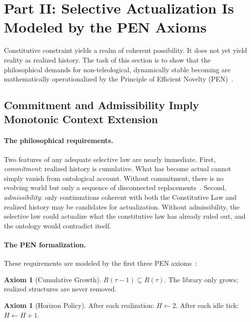\documentclass[11pt,a4paper]{article}
\theoremstyle{plain}
\theoremstyle{definition}
\newtheorem{axiom}[theorem]{Axiom}
\theoremstyle{remark}
\begin{document}
\section{Part II: Selective Actualization Is Modeled by the PEN Axioms}
\label{sec:partII}

Constitutive constraint yields a realm of coherent possibility.  It does not yet yield reality as realized history.  The task of this section is to show that the philosophical demands for non-teleological, dynamically stable becoming are mathematically operationalized by the Principle of Efficient Novelty (PEN)~\cite{pen2026}.


\subsection{Commitment and Admissibility Imply Monotonic Context Extension}
\label{sec:monotonic}

\paragraph{The philosophical requirements.}
Two features of any adequate selective law are nearly immediate.  First, \emph{commitment}: realized history is cumulative.  What has become actual cannot simply vanish from ontological account.  Without commitment, there is no evolving world but only a sequence of disconnected replacements~\cite{whitehead1929,rescher1996}.  Second, \emph{admissibility}: only continuations coherent with both the Constitutive Law and realized history may be candidates for actualization.  Without admissibility, the selective law could actualize what the constitutive law has already ruled out, and the ontology would contradict itself.

\paragraph{The PEN formalization.}
These requirements are modeled by the first three PEN axioms~\cite{pen2026}:

\begin{axiom}[Cumulative Growth]
$R(\tau - 1) \subseteq R(\tau)$.  The library only grows; realized structures are never removed.
\end{axiom}

\begin{axiom}[Horizon Policy]
After each realization: $H \leftarrow 2$.  After each idle tick: $H \leftarrow H + 1$.
\end{axiom}
\end{document}

